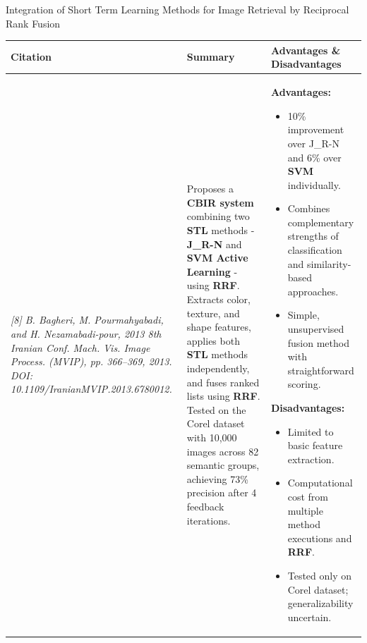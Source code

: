 \begin{frame}{Integration of Short Term Learning Methods for Image Retrieval by Reciprocal Rank Fusion}
\scriptsize
\vspace{-0.8em}

\begin{table}[h!]
\centering
\renewcommand{\arraystretch}{1.5} %
\setlength{\tabcolsep}{2.5pt}     %

\begin{tabular}{|p{2.6cm}|p{4.3cm}|p{4.3cm}|}
\hline
\textbf{Citation} & \textbf{Summary} & \textbf{Advantages \& Disadvantages} \\
\hline
\tiny\textit{[8] B. Bagheri, M. Pourmahyabadi, and H. Nezamabadi-pour, 2013 8th Iranian Conf. Mach. Vis. Image Process. (MVIP), pp. 366–369, 2013.  \newline
DOI: 10.1109/IranianMVIP.2013.6780012.}
&
Proposes a \textbf{CBIR system} combining two \textbf{STL} methods - \textbf{J\_R-N} and \textbf{SVM Active Learning} - using \textbf{RRF}. Extracts color, texture, and shape features, applies both \textbf{STL} methods independently, and fuses ranked lists using \textbf{RRF}. Tested on the Corel dataset with 10,000 images across 82 semantic groups, achieving 73\% precision after 4 feedback iterations.
&
\textbf{Advantages:}
\begin{itemize}\itemsep0.25em
\item 10\% improvement over J\_R-N and 6\% over \textbf{SVM} individually.
\item Combines complementary strengths of classification and similarity-based approaches.
\item Simple, unsupervised fusion method with straightforward scoring.
\end{itemize}

\textbf{Disadvantages:}
\begin{itemize}\itemsep0.25em
\item Limited to basic feature extraction.
\item Computational cost from multiple method executions and \textbf{RRF}.
\item Tested only on Corel dataset; generalizability uncertain.
\end{itemize} \\
\hline
\end{tabular}
\end{table}
\end{frame}
